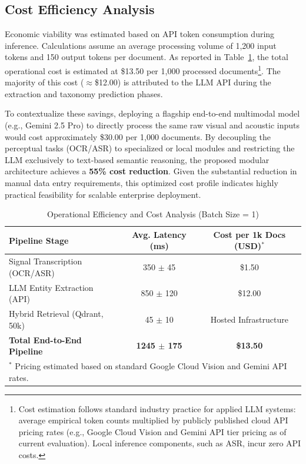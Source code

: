 \subsection{Cost Efficiency Analysis}
Economic viability was estimated based on API token consumption during inference. Calculations assume an average processing volume of 1,200 input tokens and 150 output tokens per document. As reported in Table~\ref{tab:efficiency}, the total operational cost is estimated at \$13.50 per 1,000 processed documents\footnote{Cost estimation follows standard industry practice for applied LLM systems: average empirical token counts multiplied by publicly published cloud API pricing rates (e.g., Google Cloud Vision and Gemini API tier pricing as of current evaluation). Local inference components, such as ASR, incur zero API costs.}. The majority of this cost ($\approx$\$12.00) is attributed to the LLM API during the extraction and taxonomy prediction phases. 

To contextualize these savings, deploying a flagship end-to-end multimodal model (e.g., Gemini 2.5 Pro) to directly process the same raw visual and acoustic inputs would cost approximately \$30.00 per 1,000 documents. By decoupling the perceptual tasks (OCR/ASR) to specialized or local modules and restricting the LLM exclusively to text-based semantic reasoning, the proposed modular architecture achieves a \textbf{55\% cost reduction}. Given the substantial reduction in manual data entry requirements, this optimized cost profile indicates highly practical feasibility for scalable enterprise deployment.

\begin{table}[htbp]
    \centering
    \caption{Operational Efficiency and Cost Analysis (Batch Size = 1)}
    \label{tab:efficiency}
    \renewcommand{\arraystretch}{1.2}
    \begin{tabular}{lcc}
        \hline
        \textbf{Pipeline Stage} & \textbf{Avg. Latency (ms)} & \textbf{Cost per 1k Docs (USD)}$^*$ \\
        \hline
        Signal Transcription (OCR/ASR) & 350 $\pm$ 45 & \$1.50 \\
        LLM Entity Extraction (API) & 850 $\pm$ 120 & \$12.00 \\
        Hybrid Retrieval (Qdrant, 50k) & 45 $\pm$ 10 & Hosted Infrastructure \\
        \hline
        \textbf{Total End-to-End Pipeline} & \textbf{1245 $\pm$ 175} & \textbf{\$13.50} \\
        \hline
        \multicolumn{3}{l}{\footnotesize $^*$ Pricing estimated based on standard Google Cloud Vision and Gemini API rates.}
    \end{tabular}
\end{table}

